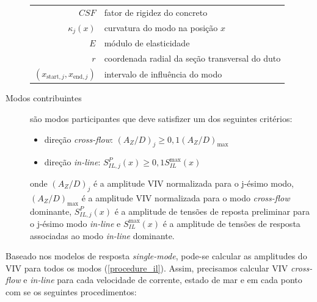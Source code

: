 \begin{description}
    \begin{tabular}{rl}
        $\mathit{CSF}$                            & fator de rigidez do concreto\\
        $\kappa_{j}(x)$                           & curvatura do modo na posição $x$\\
        $E$                                       & módulo de elasticidade\\
        $r$                                       & coordenada radial da seção transversal do duto\\
        $(x_{\text{start},j}, x_{\text{end}, j})$ & intervalo de influência do modo
    \end{tabular}

	\item [Modos contribuintes] são modos participantes que deve satisfizer um dos seguintes critérios:

        \begin{itemize}
    	\item direção \textit{cross-flow}: ${(A_Z/D)}_j \geq 0,1{(A_Z/D)}_{\max}$

        \item direção \textit{in-line}: $S_{\mathit{IL}, \mathit{j}}^{P}(x) \geq 0,1 S_\mathit{IL}^{\max}(x)$
        \end{itemize}

	onde ${(A_Z/D)}_j$ é a amplitude VIV normalizada para o j-ésimo modo, ${(A_Z/D)}_{\max}$ é a amplitude VIV normalizada para o modo \textit{cross-flow}  dominante, $S_{\mathit{IL}, \mathit{j}}^{P}(x)$ é a amplitude de tensões de reposta preliminar para o j-ésimo modo \textit{in-line} e $S_\mathit{IL}^{\max}(x)$ é a amplitude de tensões de resposta associadas ao modo \textit{in-line} dominante.

\end{description}

Baseado nos modelos de resposta \textit{single-mode}, pode-se calcular as amplitudes do VIV para todos os modos (\autoref{procedure_il}).
Assim, precisamos calcular VIV \textit{cross-flow} e \textit{in-line} para cada velocidade de corrente, estado de mar e em cada ponto com se os seguintes procedimentos:

